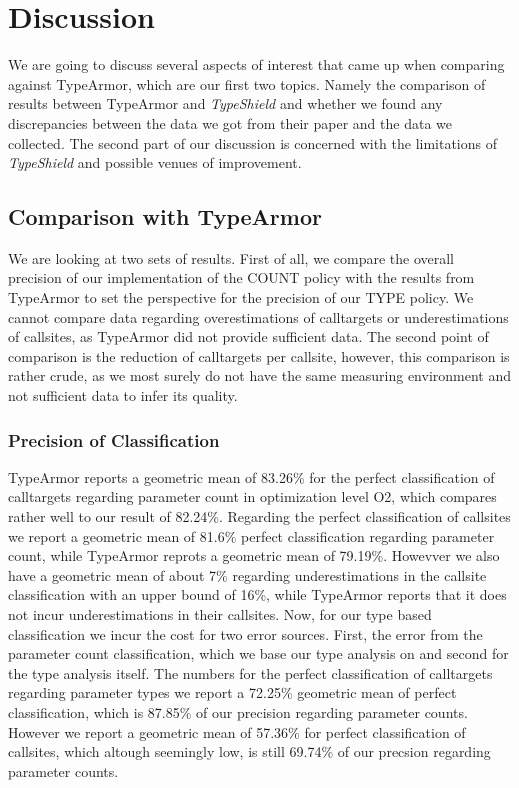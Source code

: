 \chapter{Discussion}
\label{chapter:Discussion}

We are going to discuss several aspects of interest that came up when comparing against TypeArmor, which are our first two topics. Namely the comparison of results between TypeArmor and \textit{TypeShield} and whether we found any discrepancies between the data we got from their paper and the data we collected. The second part of our discussion is concerned with the limitations of \textit{TypeShield} and possible venues of improvement.

\section{Comparison with TypeArmor}
We are looking at two sets of results. First of all, we compare the overall precision of our implementation of the COUNT policy with the results from TypeArmor to set the perspective for the precision of our TYPE policy. We cannot compare data regarding overestimations of calltargets or underestimations of callsites, as TypeArmor did not provide sufficient data. The second point of comparison is the reduction of calltargets per callsite, however, this comparison is rather crude, as we most surely do not have the same measuring environment and not sufficient data to infer its quality.

\subsection{Precision of Classification}
TypeArmor reports a geometric mean of 83.26\% for the perfect classification of calltargets regarding parameter count in optimization level O2, which compares rather well to our result of 82.24\%. Regarding the perfect classification of callsites we report a geometric mean of 81.6\% perfect classification regarding parameter count, while TypeArmor reprots a geometric mean of 79.19\%. Howevver we also have a geometric mean of about 7\% regarding underestimations in the callsite classification with an upper bound of 16\%, while TypeArmor reports that it does not incur underestimations in their callsites.
Now, for our type based classification we incur the cost for two error sources. First, the error from the parameter count classification, which we base our type analysis on and second for the type analysis itself. The numbers for the perfect classification of calltargets regarding parameter types we report a 72.25\% geometric mean of perfect classification, which is 87.85\% of our precision regarding parameter counts. However we report a geometric mean of 57.36\%
for perfect classification of callsites, which altough seemingly low, is still 69.74\% of our precsion regarding parameter counts.

